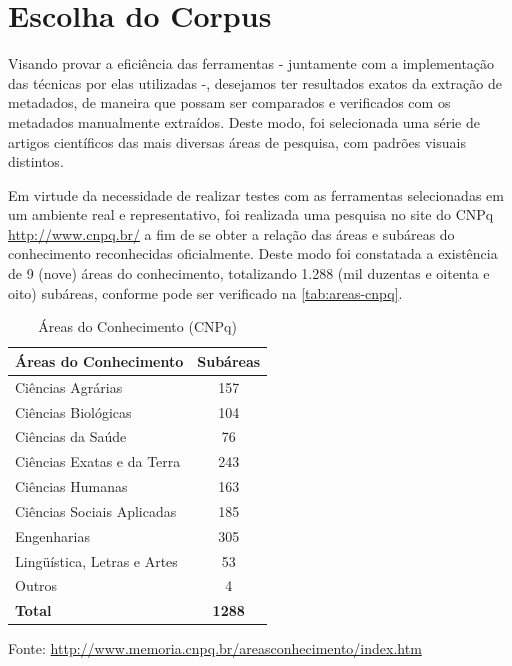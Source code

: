 \section{Escolha do Corpus}
\label{sec:corpus}


Visando provar a eficiência das ferramentas - juntamente com a implementação das técnicas por elas utilizadas -, desejamos ter resultados exatos da extração de metadados, de maneira que possam ser comparados e verificados com os metadados manualmente extraídos. Deste modo, foi selecionada uma série de artigos científicos das mais diversas áreas de pesquisa, com padrões visuais distintos.


Em virtude da necessidade de realizar testes com as ferramentas selecionadas em um ambiente real e representativo, foi realizada uma pesquisa no site do CNPq \url{http://www.cnpq.br/} a fim de se obter a relação das áreas e subáreas do conhecimento reconhecidas oficialmente. Deste modo foi constatada a existência de 9 (nove) áreas do conhecimento, totalizando 1.288 (mil duzentas e oitenta e oito) subáreas, conforme pode ser verificado na \autoref{tab:areas-cnpq}.

\begin{table}
    \caption{Áreas do Conhecimento (CNPq)}
    \begin{center}
        \begin{tabular}{|l|c|}
            \hline 
            \textbf{Áreas do Conhecimento} & \textbf{Subáreas} \\ 
            \hline 
            Ciências Agrárias & 157 \\
            Ciências Biológicas & 104 \\
            Ciências da Saúde & 76 \\
            Ciências Exatas e da Terra & 243 \\
            Ciências Humanas & 163 \\
            Ciências Sociais Aplicadas & 185 \\
            Engenharias & 305 \\
            Lingüística, Letras e Artes & 53 \\
            Outros & 4 \\
            \hline
            \textbf{Total} & \textbf{1288} \\
            \hline
        \end{tabular}
    \end{center}
    \center\footnotesize{Fonte: \url{http://www.memoria.cnpq.br/areasconhecimento/index.htm}}
    \label{tab:areas-cnpq}
\end{table}


